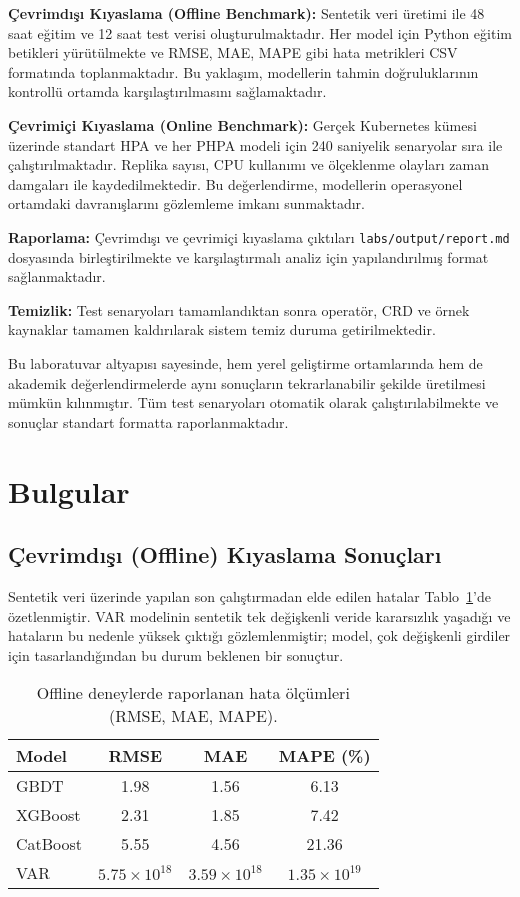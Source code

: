 \documentclass[12pt,a4paper]{article}
\begin{document}
\textbf{Çevrimdışı Kıyaslama (Offline Benchmark):} Sentetik veri üretimi ile 48 saat eğitim ve 12 saat test verisi oluşturulmaktadır. Her model için Python eğitim betikleri yürütülmekte ve RMSE, MAE, MAPE gibi hata metrikleri CSV formatında toplanmaktadır. Bu yaklaşım, modellerin tahmin doğruluklarının kontrollü ortamda karşılaştırılmasını sağlamaktadır.

\textbf{Çevrimiçi Kıyaslama (Online Benchmark):} Gerçek Kubernetes kümesi üzerinde standart HPA ve her PHPA modeli için 240 saniyelik senaryolar sıra ile çalıştırılmaktadır. Replika sayısı, CPU kullanımı ve ölçeklenme olayları zaman damgaları ile kaydedilmektedir. Bu değerlendirme, modellerin operasyonel ortamdaki davranışlarını gözlemleme imkanı sunmaktadır.

\textbf{Raporlama:} Çevrimdışı ve çevrimiçi kıyaslama çıktıları \texttt{labs/output/report.md} dosyasında birleştirilmekte ve karşılaştırmalı analiz için yapılandırılmış format sağlanmaktadır.

\textbf{Temizlik:} Test senaryoları tamamlandıktan sonra operatör, CRD ve örnek kaynaklar tamamen kaldırılarak sistem temiz duruma getirilmektedir.

Bu laboratuvar altyapısı sayesinde, hem yerel geliştirme ortamlarında hem de akademik değerlendirmelerde aynı sonuçların tekrarlanabilir şekilde üretilmesi mümkün kılınmıştır. Tüm test senaryoları otomatik olarak çalıştırılabilmekte ve sonuçlar standart formatta raporlanmaktadır.

\section{Bulgular}
\subsection{Çevrimdışı (Offline) Kıyaslama Sonuçları}
Sentetik veri üzerinde yapılan son çalıştırmadan elde edilen hatalar Tablo~\ref{tab:offline}’de özetlenmiştir. VAR modelinin sentetik tek değişkenli veride kararsızlık yaşadığı ve hataların bu nedenle yüksek çıktığı gözlemlenmiştir; model, çok değişkenli girdiler için tasarlandığından bu durum beklenen bir sonuçtur.

\begin{table}[h]
    \centering
    \caption{Offline deneylerde raporlanan hata ölçümleri (RMSE, MAE, MAPE).}
    \label{tab:offline}
    \begin{tabular}{@{}lccc@{}}
        \toprule
        Model & RMSE & MAE & MAPE (\%) \\
        \midrule
        GBDT & 1.98 & 1.56 & 6.13 \\
        XGBoost & 2.31 & 1.85 & 7.42 \\
        CatBoost & 5.55 & 4.56 & 21.36 \\
        VAR & $5.75\times10^{18}$ & $3.59\times10^{18}$ & $1.35\times10^{19}$ \\
        \bottomrule
    \end{tabular}
\end{table}
\end{document}
